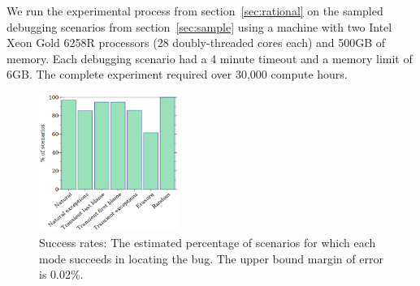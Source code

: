 
We run the experimental process from section~\ref{sec:rational} on the
sampled debugging scenarios from section~\ref{sec:sample} using a machine with two Intel Xeon Gold 6258R processors (28 doubly-threaded cores each) and 500GB of memory.
Each debugging scenario had a 4 minute timeout and a
memory limit of 6GB. The complete experiment required
over 30,000 compute hours.


\begin{figure}
  \centering
  \includegraphics[width=0.40\textwidth]{./plots/success-bars}
  \caption{Success rates: The estimated percentage of scenarios for which each mode succeeds in locating the bug.
  The upper bound margin of error is 0.02\%.
  }
  \label{fig:success-bars}
\end{figure}

